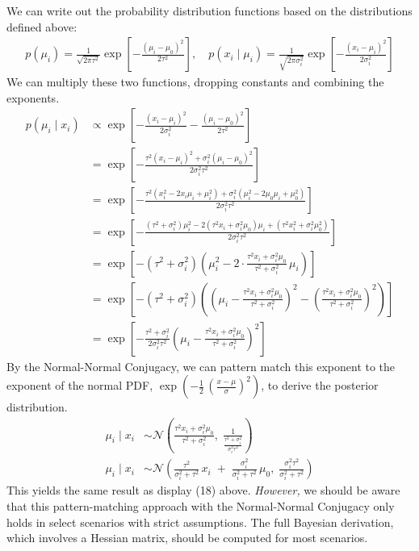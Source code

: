 \documentclass[letterpaper, 11pt]{extarticle}
\begin{document}
We can write out the probability distribution functions based on the distributions defined above:
\begin{align}
    p(\mu_i)
=
\frac{1}{\sqrt{2\pi\tau^{2}}}
\exp\!\left[
-\frac{(\mu_i - \mu_0)^2}{2\tau^{2}}
\right], \quad p(x_i \mid \mu_i)
=
\frac{1}{\sqrt{2\pi\sigma_i^{2}}}
\exp\!\left[
-\frac{(x_i - \mu_i)^2}{2\sigma_i^{2}}
\right]
\end{align}
We can multiply these two functions, dropping constants and combining the exponents.  
\begin{align}
p(\mu_i \mid x_i)
&\propto
\exp\!\left[
-\frac{(x_i - \mu_i)^2}{2\sigma_i^{2}}
-
\frac{(\mu_i - \mu_0)^2}{2\tau^{2}}
\right]
\\[1.2ex]
&=
\exp\!\left[
-\frac{
\tau^{2}(x_i - \mu_i)^{2}
+
\sigma_i^{2}(\mu_i - \mu_0)^{2}
}{
2\sigma_i^{2}\tau^{2}
}
\right]
\\[1.2ex]
&=
\exp\!\left[
-\frac{
\tau^{2}(x_i^{2} - 2x_i\mu_i + \mu_i^{2})
+
\sigma_i^{2}(\mu_i^{2} - 2\mu_0\mu_i + \mu_0^{2})
}{
2\sigma_i^{2}\tau^{2}
}
\right]
\\[1.2ex]
&=
\exp\!\left[
-\frac{
(\tau^{2} + \sigma_i^{2})\mu_i^{2}
-
2(\tau^{2}x_i + \sigma_i^{2}\mu_0)\mu_i
+
(\tau^{2}x_i^{2} + \sigma_i^{2}\mu_0^{2})
}{
2\sigma_i^{2}\tau^{2}
}
\right]\\
&=\exp\!\left[
-(\tau^{2} + \sigma_i^{2})
\left(
\mu_i^{2}
-
2\cdot
\frac{\tau^{2} x_i + \sigma_i^{2} \mu_0}{\tau^{2} + \sigma_i^{2}}
\,\mu_i
\right)
\right]
\\[1.3ex]
&=
\exp\!\left[
-(\tau^{2} + \sigma_i^{2})
\left(
\left(
\mu_i
-
\frac{\tau^{2} x_i + \sigma_i^{2} \mu_0}{\tau^{2} + \sigma_i^{2}}
\right)^{2}
-
\left(
\frac{\tau^{2} x_i + \sigma_i^{2} \mu_0}{\tau^{2} + \sigma_i^{2}}
\right)^{2}
\right)
\right]
\\[1.3ex]
&=
\exp\!\left[
-\frac{\tau^{2} + \sigma_i^{2}}{2\sigma_i^{2}\tau^{2}}
\left(
\mu_i
-
\frac{\tau^{2} x_i + \sigma_i^{2} \mu_0}{\tau^{2} + \sigma_i^{2}}
\right)^{2}
\right]
\end{align}
By the Normal-Normal Conjugacy, we can pattern match this exponent to the exponent of the normal PDF, $\exp\!\left( -\tfrac{1}{2}\,\left( \frac{x - \mu}{\sigma} \right)^{2} \right)$, to derive the posterior distribution.
\begin{align}
\mu_i \mid x_i &\sim \mathcal{N}\!\left(
\frac{\tau^{2} x_i + \sigma_i^{2} \mu_0}{\tau^{2} + \sigma_i^{2}},
\;
\frac{1}{\frac{\tau^{2} + \sigma_i^{2}}{\sigma_i^{2}\tau^{2}}}
\right)
\\[1ex]
\mu_i \mid x_i &\sim \mathcal{N}\!\left(
\frac{\tau^{2}}{\sigma_i^{2} + \tau^{2}}\,x_i
\;+\;
\frac{\sigma_i^{2}}{\sigma_i^{2} + \tau^{2}}\,\mu_0,
\;
\frac{\sigma_i^{2}\tau^{2}}{\sigma_i^{2} + \tau^{2}}
\right)
\end{align}
This yields the same result as display (18) above. \textit{However,} we should be aware that this pattern-matching approach with the Normal-Normal Conjugacy only holds in select scenarios with strict assumptions. The full Bayesian derivation, which involves a Hessian matrix, should be computed for most scenarios.  
\end{document}
